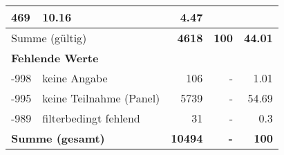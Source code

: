\begin{longtable}{lXrrr}
       \num{469} &
       \num[round-mode=places,round-precision=2]{10.16} &
         \num[round-mode=places,round-precision=2]{4.47} \\
     \midrule
     \multicolumn{2}{l}{Summe (gültig)} &
       \textbf{\num{4618}} &
     \textbf{\num{100}} &
       \textbf{\num[round-mode=places,round-precision=2]{44.01}} \\
     \multicolumn{5}{l}{\textbf{Fehlende Werte}}\\
       -998 &
       keine Angabe &
         \num{106} &
        - &
         \num[round-mode=places,round-precision=2]{1.01} \\
       -995 &
       keine Teilnahme (Panel) &
         \num{5739} &
        - &
         \num[round-mode=places,round-precision=2]{54.69} \\
       -989 &
       filterbedingt fehlend &
         \num{31} &
        - &
         \num[round-mode=places,round-precision=2]{0.3} \\
     \midrule
     \multicolumn{2}{l}{\textbf{Summe (gesamt)}} &
          \textbf{\num{10494}} &
        \textbf{-} &
        \textbf{\num{100}} \\
     \bottomrule
     \end{longtable}
     

